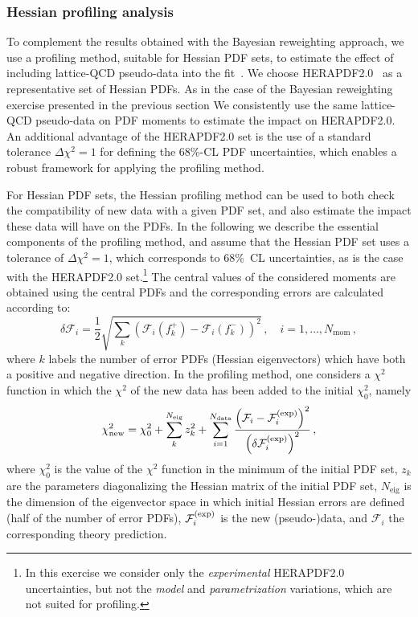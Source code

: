 \subsubsection{Hessian profiling analysis}
\label{sec:hessianprofiling}

To complement the results obtained
with the Bayesian reweighting approach,
we use a profiling method, suitable
for Hessian PDF sets, to estimate the effect of including
lattice-QCD pseudo-data into the fit~\cite{Paukkunen:2014zia,Camarda:2015zba}.
%
We choose HERAPDF2.0~\cite{Abramowicz:2015mha}
as a representative set of Hessian PDFs.
%
As in the case of the Bayesian reweighting
exercise presented in the previous section
We consistently use the same lattice-QCD
pseudo-data on PDF moments to estimate the impact on HERAPDF2.0.
%
An additional advantage of the HERAPDF2.0 set is
the use
of a standard tolerance
$\Delta\chi^2=1$ for defining the 68\%-CL PDF
uncertainties,
which enables a robust framework for applying the profiling method. 


For Hessian PDF sets, the Hessian profiling method
can be used to both check the compatibility of new data with a given PDF set,
and also  estimate the impact these data will have on the PDFs. 
In the following we describe the essential components of the profiling method, 
and assume  that the  Hessian PDF set uses a tolerance of $\Delta\chi^2=1$, 
which corresponds to 68\%~CL uncertainties,
as is the case with the HERAPDF2.0 set.\footnote{In this exercise
we consider only the {\it experimental} HERAPDF2.0
uncertainties, but not the {\it model} and {\it parametrization}
variations, which are not suited for profiling.}
%
The central values of the considered moments are obtained using the central PDFs and the corresponding
errors are calculated according to:
\begin{equation}
\delta\mathcal{F}_i = \frac{1}{2} \sqrt{\sum_{k}\left(\mathcal{F}_i(f_k^+)-\mathcal{F}_i(f_k^-)\right)^2}\, ,
\quad i=1,\ldots,N_\text{mom} \, ,
\end{equation}
where $k$ labels the number of error PDFs (Hessian eigenvectors)
which have both a positive and negative direction.
%
In the profiling method, one considers a $\chi^2$ function in which the $\chi^2$ of the new
data has been added to the initial $\chi^2_0$, namely
\begin{equation}
\label{eq:newchi2}
\chi^2_{\text{new}} = \chi_0^2 + \sum_{k}^{N_{\text{eig}}} z_k^2
                    + \sum_{i=1}^{N_{\text{data}}}
                      {{\left( \mathcal{F}_i - \mathcal{F}_i^{\rm(exp)}\right)^2}\over {\left(\delta\mathcal{F}_i^{\rm(exp)}\right)^2}}\,,
\end{equation}
where $\chi^2_0$ is the value of the $\chi^2$ function in the minimum of the initial PDF set,
$z_k$ are the parameters diagonalizing the Hessian matrix of the initial PDF set,
$N_{\text{eig}}$ is the dimension of the eigenvector space in which initial Hessian errors are defined
(half of the number of error PDFs), $\mathcal{F}_i^{\rm(exp)}$ is the new
\hbox{(pseudo-)data},
and $\mathcal{F}_i$ the corresponding theory prediction.

